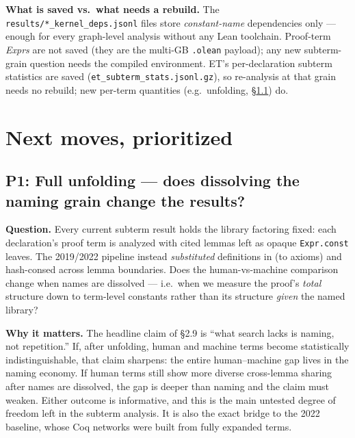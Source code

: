 \documentclass[11pt]{article}
\newcommand{\code}[1]{\texttt{#1}}
\begin{document}
\noindent\textbf{What is saved vs.\ what needs a rebuild.} The
\code{results/*\_kernel\_deps.jsonl} files store \emph{constant-name} dependencies only ---
enough for every graph-level analysis without any Lean toolchain. Proof-term \emph{Exprs} are
not saved (they are the multi-GB \code{.olean} payload); any new subterm-grain question needs
the compiled environment. ET's per-declaration subterm statistics are saved
(\code{et\_subterm\_stats.jsonl.gz}), so re-analysis at that grain needs no rebuild; new
per-term quantities (e.g.\ unfolding, \S\ref{sec:unfold}) do.

\section{Next moves, prioritized}

\subsection{P1: Full unfolding --- does dissolving the naming grain change the results?}
\label{sec:unfold}

\textbf{Question.} Every current subterm result holds the library factoring fixed: each
declaration's proof term is analyzed with cited lemmas left as opaque \code{Expr.const}
leaves. The 2019/2022 pipeline instead \emph{substituted} definitions in (to axioms) and
hash-consed across lemma boundaries. Does the human-vs-machine comparison change when names
are dissolved --- i.e.\ when we measure the proof's \emph{total} structure down to term-level
constants rather than its structure \emph{given} the named library?

\textbf{Why it matters.} The headline claim of \S2.9 is ``what search lacks is naming, not
repetition.'' If, after unfolding, human and machine terms become statistically
indistinguishable, that claim sharpens: the entire human--machine gap lives in the naming
economy. If human terms still show more diverse cross-lemma sharing after names are
dissolved, the gap is deeper than naming and the claim must weaken. Either outcome is
informative, and this is the main untested degree of freedom left in the subterm analysis.
It is also the exact bridge to the 2022 baseline, whose Coq networks were built from fully
expanded terms.
\end{document}
